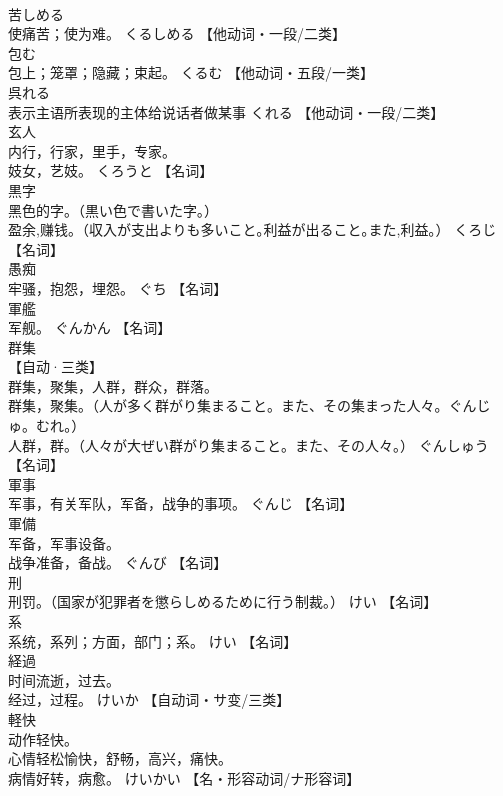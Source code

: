 \documentclass[8pt]{extreport}
\begin{document}
\begin{CJK}{UTF8}{min}
\\	苦しめる	
\\	使痛苦；使为难。	くるしめる		【他动词・一段/二类】
\\	包む	
\\	包上；笼罩；隐藏；束起。	くるむ		【他动词・五段/一类】
\\	呉れる	
\\	表示主语所表现的主体给说话者做某事	くれる		【他动词・一段/二类】
\\	玄人	
\\	内行，行家，里手，专家。 
\\	妓女，艺妓。	くろうと		【名词】
\\	黒字	
\\	黑色的字。（黒い色で書いた字｡） 
\\	盈余,赚钱。（収入が支出よりも多いこと｡利益が出ること｡また,利益｡）	くろじ		【名词】
\\	愚痴	
\\	牢骚，抱怨，埋怨。	ぐち		【名词】
\\	軍艦	
\\	军舰。	ぐんかん		【名词】
\\	群集	
\\	【自动·三类】 
\\	群集，聚集，人群，群众，群落。 
\\	群集，聚集。（人が多く群がり集まること。また、その集まった人々。ぐんじゅ。むれ。） 
\\	人群，群。（人々が大ぜい群がり集まること。また、その人々。）	ぐんしゅう		【名词】
\\	軍事	
\\	军事，有关军队，军备，战争的事项。	ぐんじ		【名词】
\\	軍備	
\\	军备，军事设备。 
\\	战争准备，备战。	ぐんび		【名词】
\\	刑	
\\	刑罚。（国家が犯罪者を懲らしめるために行う制裁。）	けい		【名词】
\\	系	
\\	系统，系列；方面，部门；系。	けい		【名词】
\\	経過	
\\	时间流逝，过去。 
\\	经过，过程。	けいか		【自动词・サ变/三类】
\\	軽快	
\\	动作轻快。 
\\	心情轻松愉快，舒畅，高兴，痛快。 
\\	病情好转，病愈。	けいかい		【名・形容动词/ナ形容词】

\end{CJK}
\end{document}
